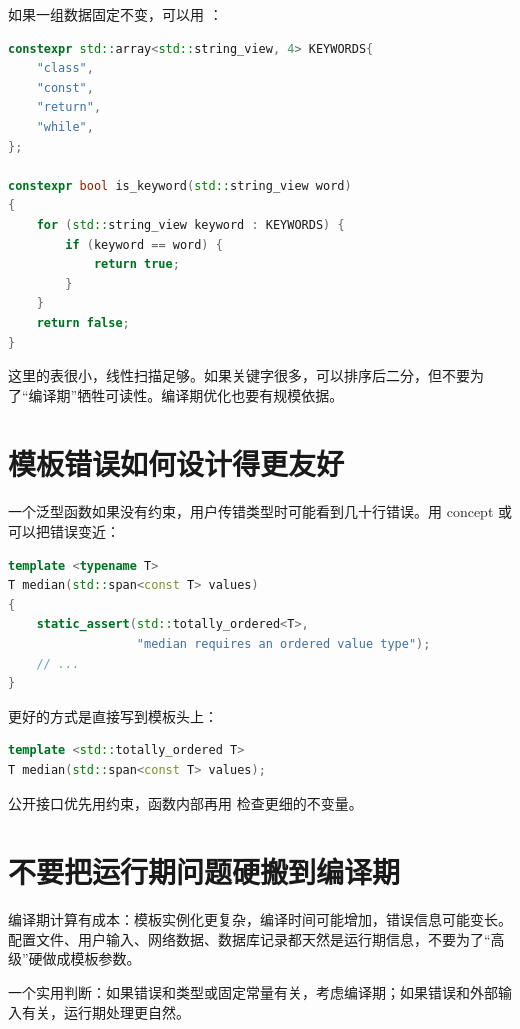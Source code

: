 如果一组数据固定不变，可以用 ：

\begin{lstlisting}[language=C++,caption={编译期关键字表}]
constexpr std::array<std::string_view, 4> KEYWORDS{
    "class",
    "const",
    "return",
    "while",
};

constexpr bool is_keyword(std::string_view word)
{
    for (std::string_view keyword : KEYWORDS) {
        if (keyword == word) {
            return true;
        }
    }
    return false;
}
\end{lstlisting}

这里的表很小，线性扫描足够。如果关键字很多，可以排序后二分，但不要为了“编译期”牺牲可读性。编译期优化也要有规模依据。

\section{模板错误如何设计得更友好}

一个泛型函数如果没有约束，用户传错类型时可能看到几十行错误。用 concept 或  可以把错误变近：

\begin{lstlisting}[language=C++,caption={用编译期断言给出明确错误}]
template <typename T>
T median(std::span<const T> values)
{
    static_assert(std::totally_ordered<T>,
                  "median requires an ordered value type");
    // ...
}
\end{lstlisting}

更好的方式是直接写到模板头上：

\begin{lstlisting}[language=C++,caption={约束排序能力}]
template <std::totally_ordered T>
T median(std::span<const T> values);
\end{lstlisting}

公开接口优先用约束，函数内部再用  检查更细的不变量。

\section{不要把运行期问题硬搬到编译期}

编译期计算有成本：模板实例化更复杂，编译时间可能增加，错误信息可能变长。配置文件、用户输入、网络数据、数据库记录都天然是运行期信息，不要为了“高级”硬做成模板参数。

一个实用判断：如果错误和类型或固定常量有关，考虑编译期；如果错误和外部输入有关，运行期处理更自然。

